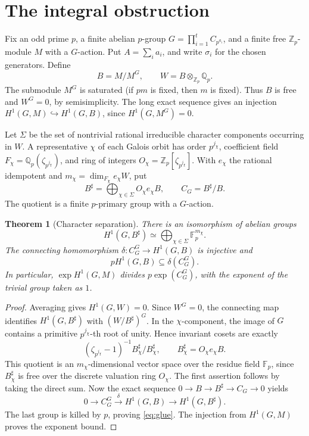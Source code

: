 \documentclass[11pt]{article}
\newtheorem{theorem}{Theorem}[section]
\theoremstyle{definition}\newtheorem{definition}[theorem]{Definition}\newtheorem{example}[theorem]{Example}
\theoremstyle{remark}\newtheorem{remark}[theorem]{Remark}
\newcommand{\Zp}{\mathbb Z_p}\newcommand{\Qp}{\mathbb Q_p}\newcommand{\Fp}{\mathbb F_p}
\begin{document}
\section{The integral obstruction}
Fix an odd prime $p$, a finite abelian $p$-group $G=\prod_{i=1}^t C_{p^{a_i}}$, and a finite free $\Zp$-module $M$ with a $G$-action. Put $A=\sum_i a_i$, and write $\sigma_i$ for the chosen generators. Define
\begin{equation}
 B=M/M^G,\qquad W=B\otimes_{\Zp}\Qp.
\end{equation}
The submodule $M^G$ is saturated (if $pm$ is fixed, then $m$ is fixed). Thus $B$ is free and $W^G=0$, by semisimplicity. The long exact sequence gives an injection $H^1(G,M)\hookrightarrow H^1(G,B)$, since $H^1(G,M^G)=0$.

Let $\Sigma$ be the set of nontrivial rational irreducible character components occurring in $W$. A representative $\chi$ of each Galois orbit has order $p^{j_\chi}$, coefficient field $F_\chi=\Qp(\zeta_{p^{j_\chi}})$, and ring of integers $O_\chi=\Zp[\zeta_{p^{j_\chi}}]$. With $e_\chi$ the rational idempotent and $m_\chi=\dim_{F_\chi} e_\chi W$, put
\begin{equation}
 B^\sharp=\bigoplus_{\chi\in\Sigma}O_\chi e_\chi B,
 \qquad C_G=B^\sharp/B.
\end{equation}
The quotient is a finite $p$-primary group with a $G$-action.

\begin{theorem}[Character separation]\label{thm:sep}
There is an isomorphism of abelian groups
\begin{equation}
 H^1(G,B^\sharp)\simeq\bigoplus_{\chi\in\Sigma}\Fp^{m_\chi}.
\end{equation}
The connecting homomorphism $\delta:C_G^G\to H^1(G,B)$ is injective and
\begin{equation}\label{eq:glue}
 \boxed{pH^1(G,B)\subseteq\delta(C_G^G).}
\end{equation}
In particular, $\exp H^1(G,M)$ divides $p\exp(C_G^G)$, with the exponent of the trivial group taken as $1$.
\end{theorem}
\begin{proof}
Averaging gives $H^1(G,W)=0$. Since $W^G=0$, the connecting map identifies $H^1(G,B^\sharp)$ with $(W/B^\sharp)^G$. In the $\chi$-component, the image of $G$ contains a primitive $p^{j_\chi}$-th root of unity. Hence invariant cosets are exactly
\[
 (\zeta_{p^{j_\chi}}-1)^{-1}B^\sharp_\chi/B^\sharp_\chi,
 \qquad B^\sharp_\chi=O_\chi e_\chi B.
\]
This quotient is an $m_\chi$-dimensional vector space over the residue field $\Fp$, since $B^\sharp_\chi$ is free over the discrete valuation ring $O_\chi$. The first assertion follows by taking the direct sum. Now the exact sequence $0\to B\to B^\sharp\to C_G\to0$ yields
\[
 0\longrightarrow C_G^G\xrightarrow{\delta} H^1(G,B)
 \longrightarrow H^1(G,B^\sharp).
\]
The last group is killed by $p$, proving \eqref{eq:glue}. The injection from $H^1(G,M)$ proves the exponent bound.
\end{proof}
\end{document}
